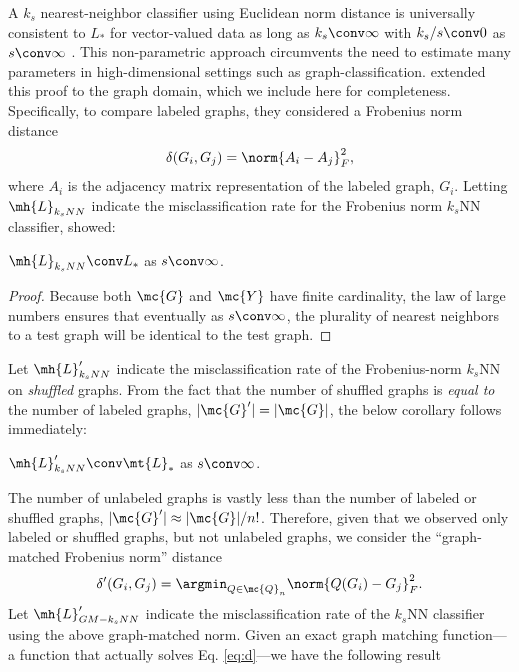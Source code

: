 \documentclass[10pt,journal,cspaper,compsoc]{IEEEtran}
\begin{document}
A $k_s$ nearest-neighbor classifier 
using Euclidean norm distance
is universally consistent to $L_*$ for vector-valued data 
as long as $k_s \conv \infty$ with $k_s/s \conv 0$ as $s \conv \infty$ \cite{Stone1977}. This non-parametric approach circumvents the need to estimate many parameters in high-dimensional settings such as graph-classification. \cite{VP11_super} extended this proof to the graph domain, which we include here for completeness.  Specifically, to compare labeled graphs, they considered a Frobenius norm distance
\begin{align}
	\delta(G_i,G_j)=\norm{A_i-A_j}_F^2,
\end{align}
where $A_i$ is the adjacency matrix representation of the labeled graph, $G_i$.  Letting $\mh{L}_{k_sNN}$ indicate the misclassification rate for the Frobenius norm $k_s$NN classifier, \cite{VP11_super} showed:
\begin{thm} \label{thm:5}
	$\mh{L}_{k_sNN} \conv L_*$ as $s \conv \infty$.
\end{thm}
\begin{proof}
Because both $\mc{G}$ and $\mc{Y}$ have finite cardinality, the law of large numbers ensures that eventually as $s \conv \infty$, the plurality of nearest neighbors to a test graph will be identical to the test graph. 
\end{proof}
Let $\mh{L}_{k_sNN}'$ indicate the misclassification rate of the Frobenius-norm $k_s$NN on \emph{shuffled} graphs.  From the fact that the number of shuffled graphs is \emph{equal to} the number of labeled graphs, $|\mc{G}'| = |\mc{G}|$,  the below corollary follows immediately:
\begin{coro} \label{cor:1}
	$\mh{L}_{k_sNN}' \conv \mt{L}_*$ as $s \conv \infty$.
\end{coro}
The number of unlabeled graphs is vastly less than the number of labeled or shuffled graphs, $|\mc{G}'| \approx |\mc{G}|/n!$.  Therefore, given that we observed only labeled or shuffled graphs, but not unlabeled graphs, we consider the ``graph-matched Frobenius norm'' distance
\begin{align} \label{eq:d}
\delta'(G_i,G_j)=\argmin_{Q \in \mc{Q}_n}\norm{Q(G_i)-G_j}_F^2.	
\end{align}
Let $\mh{L}_{GM-k_sNN}'$ indicate the misclassification rate of the $k_s$NN classifier using the above graph-matched norm.  Given an exact graph matching function---a function that actually solves Eq. \eqref{eq:d}---we have the following result
\end{document}
